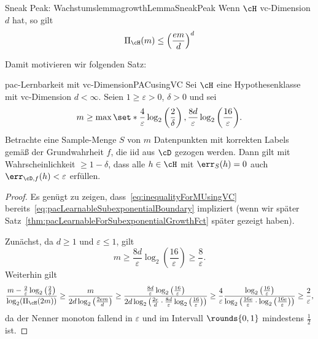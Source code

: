 \documentclass[language=ngerman,algolist,acrolist]{TemplateLecture}
\begin{document}
\begin{lem}{Sneak Peak: Wachstumslemma}{growthLemmaSneakPeak}
    Wenn $\cH$ \ac{vc}-Dimension $d$ hat, so gilt 
    \begin{equation*}
        \Pi_\cH(m) \leq \left( \frac{em}{d} \right)^d
    \end{equation*}
\end{lem}
Damit motivieren wir folgenden Satz:
\begin{thm}{\ac{pac}-Lernbarkeit mit \ac{vc}-Dimension}{PACusingVC}
    Sei $\cH$ eine Hypothesenklasse mit \ac{vc}-Dimension $d < \infty$. Seien $1 \geq \varepsilon > 0$, $\delta > 0$ und sei 
    \begin{equation}
        m \geq \max\set*{\frac{4}{\varepsilon} \log_2\left( \frac{2}{\delta} \right), \frac{8d}{\varepsilon}\log_2\left( \frac{16}{\varepsilon} \right)}. \label{eq:inequalityForMUsingVC}
    \end{equation}
    Betrachte eine Sample-Menge $S$ von $m$ Datenpunkten mit korrekten Labels gemäß der Grundwahrheit $f$, die \ac{iid} aus $\cD$ gezogen werden. Dann gilt mit Wahrscheinlichkeit $ \geq 1 - \delta$, dass alle $h \in \cH$ mit $\err_S(h) = 0$ auch $\err_{\cD, f}(h) < \varepsilon$ erfüllen.
\end{thm}
\begin{proof}
    Es genügt zu zeigen, dass~\eqref{eq:inequalityForMUsingVC} bereits~\eqref{eq:pacLearnableSubexponentialBoundary} impliziert (wenn wir später Satz~\ref{thm:pacLearnableForSubexponentialGrowthFct} später gezeigt haben).

    Zunächst, da $d \geq 1$ und $\varepsilon \leq 1$, gilt 
    \begin{equation*}
        m \geq \frac{8d}{\varepsilon}\log_2\left( \frac{16}{\varepsilon} \right) \geq \frac{8}{\varepsilon}.
    \end{equation*}
    Weiterhin gilt
    \begin{equation*}
        \frac{m - \frac{2}{\varepsilon}\log_2\left( \frac{2}{\delta} \right)}{\log_2(\Pi_\cH(2m))} \geq \frac{m}{2d\log_2\left( \frac{2em}{d} \right)} \geq \frac{\frac{8d}{\varepsilon}\log_2\left( \frac{16}{\varepsilon} \right)}{2d\log_2\left( \frac{2e}{d} \cdot \frac{8d}{\varepsilon}\log_2\left( \frac{16}{\varepsilon} \right) \right)} \geq \frac{4}{\varepsilon}\frac{\log_2\left( \frac{16}{\varepsilon} \right)}{\log_2\left(\frac{16e}{\varepsilon} \cdot \log_2\left(\frac{16e}{\varepsilon}   \right)\right)} \geq \frac{2}{\varepsilon},
    \end{equation*}
    da der Nenner monoton fallend in $\varepsilon$ und im Intervall $\rounds{0,1}$ mindestens $\frac{1}{2}$ ist.
\end{proof}
\end{document}
